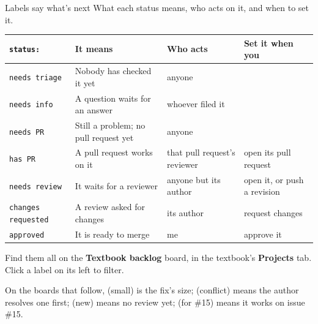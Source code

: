 \documentclass[9pt,aspectratio=169]{beamer}
\begin{document}
\begin{frame}{Labels say what's next}
    What each status means, who acts on it, and when to set it.

    \medskip

    {\small\setlength{\tabcolsep}{4pt}%
    \begin{tabular}{@{}llll@{}}
        \toprule
        \texttt{status:} & It means & Who acts & Set it when you \\
        \midrule
        \texttt{needs triage} & Nobody has checked it yet & anyone & \\
        \texttt{needs info} & A question waits for an answer & whoever filed it & \\
        \texttt{needs PR} & Still a problem; no pull request yet & anyone & \\
        \texttt{has PR} & A pull request works on it & that pull request's reviewer & open its pull request \\
        \midrule
        \texttt{needs review} & It waits for a reviewer & anyone but its author & open it, or push a revision \\
        \texttt{changes requested} & A review asked for changes & its author & request changes \\
        \texttt{approved} & It is ready to merge & me & approve it \\
        \bottomrule
    \end{tabular}}

    \medskip

    {\footnotesize Find them all on the \textbf{Textbook backlog} board, in the textbook's \textbf{Projects} tab. Click a label on its left to filter.

    On the boards that follow, (small) is the fix's size; (conflict) means the author resolves one first; (new) means no review yet; (for \#15) means it works on issue \#15.}
\end{frame}
\end{document}
